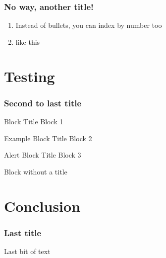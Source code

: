 \documentclass[
    11pt, %
    aspectratio=169, %
]{beamer}
\begin{document}
\begin{frame}
	\frametitle{No way, another title!}
            \begin{enumerate}
                \item Instead of bullets, you can index by number too\newline
                \item like this
            \end{enumerate}
\end{frame}

\section{Testing}

\begin{frame}
	\frametitle{Second to last title}
    	\begin{block}{Block Title}
    		Block 1
    	\end{block}
    	
    	\begin{exampleblock}{Example Block Title}
    		Block 2
    	\end{exampleblock}
    	
    	\begin{alertblock}{Alert Block Title}
    		Block 3
    	\end{alertblock}
    	
    	\begin{block}{} %
    		Block without a title
    	\end{block}
\end{frame}

\section{Conclusion}
\begin{frame}
	\frametitle{Last title}
		
	Last bit of text

\end{frame}

\end{document}
